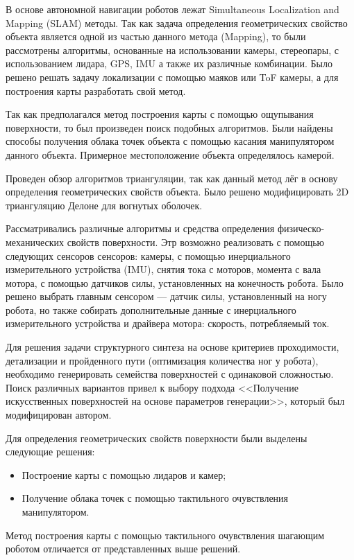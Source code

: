 В основе автономной навигации роботов лежат Simultaneous Localization and Mapping (SLAM) методы. Так как задача определения геометрических свойство объекта является одной из частью данного метода (Mapping), то были рассмотрены алгоритмы, основанные на использовании камеры, стереопары, с использованием лидара, GPS, IMU а также их различные комбинации. Было решено решать задачу локализации с помощью маяков или ToF камеры, а для построения карты разработать свой метод.

Так как предполагался метод построения карты с помощью ощупывания поверхности, то был произведен поиск подобных алгоритмов. Были найдены способы получения облака точек объекта с помощью касания манипулятором данного объекта. Примерное местоположение объекта определялось камерой.

Проведен обзор алгоритмов триангуляции, так как данный метод лёг в основу определения геометрических свойств объекта. Было решено модифицировать 2D триангуляцию Делоне для вогнутых оболочек.

Рассматривались различные алгоритмы и средства определения физическо-механических свойств поверхности. Этр возможно реализовать с помощью следующих сенсоров сенсоров: камеры, с помощью инерциального измерительного устройства (IMU),  снятия тока с моторов, момента с вала мотора, с помощью датчиков силы, установленных на конечность робота. Было решено выбрать главным сенсором --- датчик силы, установленный на ногу робота, но также собирать дополнительные данные с инерциального измерительного устройства и драйвера мотора: скорость, потребляемый ток.

Для решения задачи структурного синтеза на основе критериев проходимости, детализации и пройденного пути (оптимизация количества ног у робота), необходимо генерировать семейства поверхностей с одинаковой сложностью. Поиск различных вариантов привел к выбору подхода <<Получение искусственных поверхностей на основе параметров генерации>>, который был модифицирован автором.

Для определения геометрических свойств поверхности были  выделены следующие решения:
\begin{itemize}
    \item Построение карты с помощью лидаров и камер;
    \item Получение облака точек с помощью тактильного очувствления манипулятором.
\end{itemize}
Метод построения карты с помощью тактильного очувствления шагающим роботом отличается от представленных выше решений.

